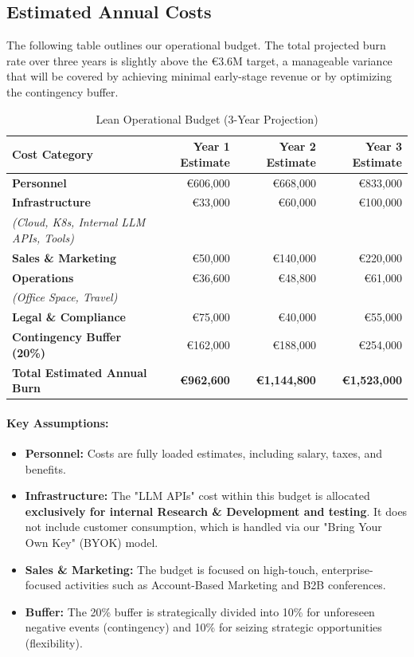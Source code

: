\documentclass[11pt, a4paper, oneside]{article}
\begin{document}
\subsection{Estimated Annual Costs}
The following table outlines our operational budget. The total projected burn rate over three years is slightly above the \euro{3.6M} target, a manageable variance that will be covered by achieving minimal early-stage revenue or by optimizing the contingency buffer.

\begin{table}[H]
\centering
\caption{Lean Operational Budget (3-Year Projection)}
\label{tab:lean_budget_revised}
\begin{tabularx}{\textwidth}{L r r r}
\toprule
\textbf{Cost Category} & \textbf{Year 1 Estimate} & \textbf{Year 2 Estimate} & \textbf{Year 3 Estimate} \\
\midrule
\textbf{Personnel} & \euro{606,000} & \euro{668,000} & \euro{833,000} \\
\addlinespace
\textbf{Infrastructure} & \euro{33,000} & \euro{60,000} & \euro{100,000} \\
\textit{(Cloud, K8s, Internal LLM APIs, Tools)} & & & \\
\addlinespace
\textbf{Sales \& Marketing} & \euro{50,000} & \euro{140,000} & \euro{220,000} \\
\addlinespace
\textbf{Operations} & \euro{36,600} & \euro{48,800} & \euro{61,000} \\
\textit{(Office Space, Travel)} & & & \\
\addlinespace
\textbf{Legal \& Compliance} & \euro{75,000} & \euro{40,000} & \euro{55,000} \\
\addlinespace
\textbf{Contingency Buffer (20\%)} & \euro{162,000} & \euro{188,000} & \euro{254,000} \\
\midrule
\textbf{Total Estimated Annual Burn} & \textbf{\euro{962,600}} & \textbf{\euro{1,144,800}} & \textbf{\euro{1,523,000}} \\
\bottomrule
\end{tabularx}
\end{table}

\paragraph*{Key Assumptions:}
\begin{itemize}
    \item \textbf{Personnel:} Costs are fully loaded estimates, including salary, taxes, and benefits.
    \item \textbf{Infrastructure:} The "LLM APIs" cost within this budget is allocated \textbf{exclusively for internal Research \& Development and testing}. It does not include customer consumption, which is handled via our "Bring Your Own Key" (BYOK) model.
    \item \textbf{Sales \& Marketing:} The budget is focused on high-touch, enterprise-focused activities such as Account-Based Marketing and B2B conferences.
    \item \textbf{Buffer:} The 20\% buffer is strategically divided into 10\% for unforeseen negative events (contingency) and 10\% for seizing strategic opportunities (flexibility).
\end{itemize}
\end{document}
